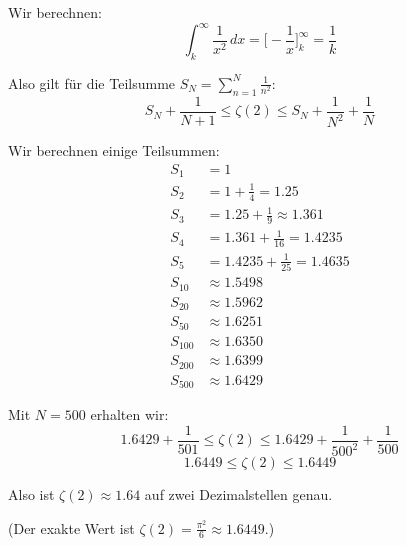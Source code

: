 \documentclass{article}
\begin{document}
Wir berechnen:
$$\int_k^\infty \frac{1}{x^2}\,dx = \Big[-\frac{1}{x}\Big]_k^\infty = \frac{1}{k}$$

Also gilt für die Teilsumme $S_N = \sum_{n=1}^N \frac{1}{n^2}$:
$$S_N + \frac{1}{N+1} \leq \zeta(2) \leq S_N + \frac{1}{N^2} + \frac{1}{N}$$

Wir berechnen einige Teilsummen:
\begin{align}
S_1 &= 1 \\
S_2 &= 1 + \frac{1}{4} = 1.25 \\
S_3 &= 1.25 + \frac{1}{9} \approx 1.361 \\
S_4 &= 1.361 + \frac{1}{16} = 1.4235 \\
S_5 &= 1.4235 + \frac{1}{25} = 1.4635 \\
S_{10} &\approx 1.5498 \\
S_{20} &\approx 1.5962 \\
S_{50} &\approx 1.6251 \\
S_{100} &\approx 1.6350 \\
S_{200} &\approx 1.6399 \\
S_{500} &\approx 1.6429
\end{align}

Mit $N = 500$ erhalten wir:
$$1.6429 + \frac{1}{501} \leq \zeta(2) \leq 1.6429 + \frac{1}{500^2} + \frac{1}{500}$$
$$1.6449 \leq \zeta(2) \leq 1.6449$$

Also ist $\zeta(2) \approx 1.64$ auf zwei Dezimalstellen genau.

(Der exakte Wert ist $\zeta(2) = \frac{\pi^2}{6} \approx 1.6449$.)
\end{document}
